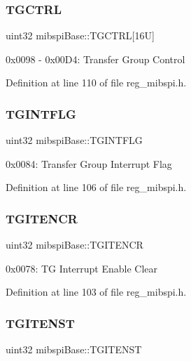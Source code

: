\subsubsection{\texorpdfstring{T\+G\+C\+T\+RL}{TGCTRL}}
{\footnotesize\ttfamily uint32 mibspi\+Base\+::\+T\+G\+C\+T\+RL\mbox{[}16\+U\mbox{]}}

0x0098 -\/ 0x00\+D4\+: Transfer Group Control 

Definition at line 110 of file reg\+\_\+mibspi.\+h.

\mbox{\label{structmibspiBase_a156440dc0e70a376ce4e24ab2508fe4d}} 
\subsubsection{\texorpdfstring{T\+G\+I\+N\+T\+F\+LG}{TGINTFLG}}
{\footnotesize\ttfamily uint32 mibspi\+Base\+::\+T\+G\+I\+N\+T\+F\+LG}

0x0084\+: Transfer Group Interrupt Flag 

Definition at line 106 of file reg\+\_\+mibspi.\+h.

\mbox{\label{structmibspiBase_a87d02599778f36e54223ae5c9c9bd735}} 
\subsubsection{\texorpdfstring{T\+G\+I\+T\+E\+N\+CR}{TGITENCR}}
{\footnotesize\ttfamily uint32 mibspi\+Base\+::\+T\+G\+I\+T\+E\+N\+CR}

0x0078\+: TG Interrupt Enable Clear 

Definition at line 103 of file reg\+\_\+mibspi.\+h.

\mbox{\label{structmibspiBase_abe6229545c7c2f8aefaa7791d74a354b}} 
\subsubsection{\texorpdfstring{T\+G\+I\+T\+E\+N\+ST}{TGITENST}}
{\footnotesize\ttfamily uint32 mibspi\+Base\+::\+T\+G\+I\+T\+E\+N\+ST}

